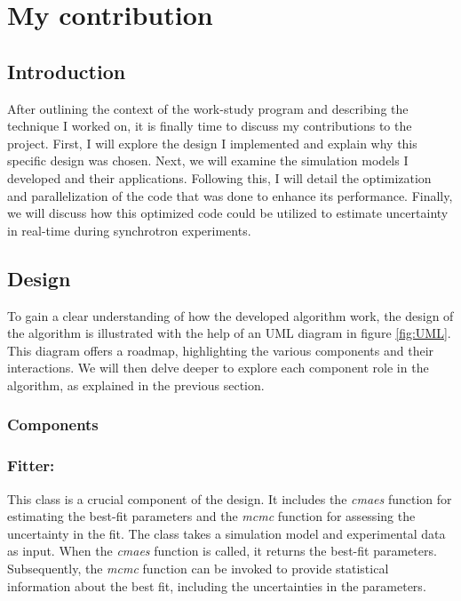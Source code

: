 \section{My contribution}

\subsection{Introduction}

After outlining the context of the work-study program and describing the technique I worked
on, it is finally time to discuss my contributions to the project. First, I will explore 
the design I implemented and explain why this specific design was chosen. Next, we will 
examine the simulation models I developed and their applications. Following this, I will 
detail the optimization and parallelization of the code that was done to enhance its performance. 
Finally, we will discuss how this optimized code could be utilized to estimate uncertainty
in real-time during synchrotron experiments.

\subsection{Design}

To gain a clear understanding of how the developed algorithm work, the design of the algorithm is illustrated with the help of an 
UML diagram in figure \ref{fig:UML}. This diagram offers a roadmap, highlighting the various components and their interactions.
We will then delve deeper to explore each component role in the algorithm, as explained in the previous section.
\subsubsection{Components}

\subsubsection*{\textbf{Fitter:}}
This class is a crucial component of the design. It includes the \textit{cmaes} function for estimating the
best-fit parameters and the \textit{mcmc} function for assessing the uncertainty in the fit. The class takes
a simulation model and experimental data as input. When the \textit{cmaes} function is called, it returns the best-fit parameters.
Subsequently, the \textit{mcmc} function can be invoked to provide statistical information about the best
fit, including the uncertainties in the parameters.

